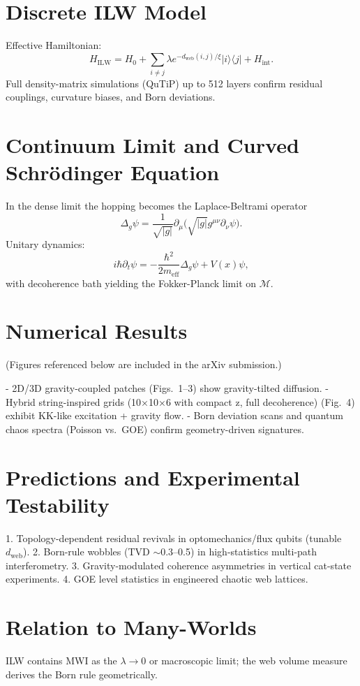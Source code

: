 \documentclass[11pt, a4paper]{article}
\begin{document}
\section{Discrete ILW Model}
Effective Hamiltonian:
\[
H_\text{ILW} = H_0 + \sum_{i\neq j} \lambda e^{-d_\text{web}(i,j)/\xi} |i\rangle\langle j| + H_\text{int}.
\]
Full density-matrix simulations (QuTiP) up to 512 layers confirm residual couplings, curvature biases, and Born deviations.

\section{Continuum Limit and Curved Schrödinger Equation}
In the dense limit the hopping becomes the Laplace-Beltrami operator
\[
\Delta_g \psi = \frac{1}{\sqrt{|g|}} \partial_\mu \bigl( \sqrt{|g|} g^{\mu\nu} \partial_\nu \psi \bigr).
\]
Unitary dynamics:
\[
i\hbar \partial_t \psi = -\frac{\hbar^2}{2m_\text{eff}} \Delta_g \psi + V(x) \psi,
\]
with decoherence bath yielding the Fokker-Planck limit on \(\mathcal{M}\).

\section{Numerical Results}
(Figures referenced below are included in the arXiv submission.)

- 2D/3D gravity-coupled patches (Figs.\ 1--3) show gravity-tilted diffusion.
- Hybrid string-inspired grids (10×10×6 with compact z, full decoherence) (Fig.\ 4) exhibit KK-like excitation + gravity flow.
- Born deviation scans and quantum chaos spectra (Poisson vs.\ GOE) confirm geometry-driven signatures.

\section{Predictions and Experimental Testability}
1. Topology-dependent residual revivals in optomechanics/flux qubits (tunable \(d_\text{web}\)).
2. Born-rule wobbles (TVD \(\sim 0.3\)--0.5) in high-statistics multi-path interferometry.
3. Gravity-modulated coherence asymmetries in vertical cat-state experiments.
4. GOE level statistics in engineered chaotic web lattices.

\section{Relation to Many-Worlds}
ILW contains MWI as the \(\lambda\to 0\) or macroscopic limit; the web volume measure derives the Born rule geometrically.
\end{document}
